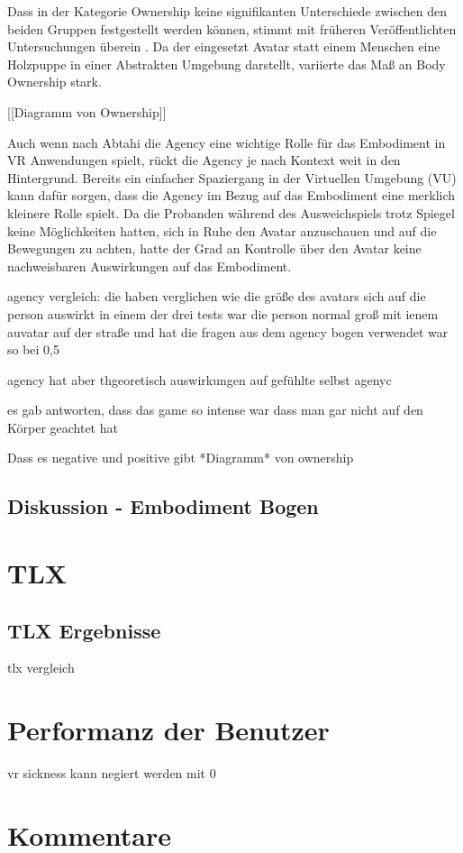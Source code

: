 Dass in der Kategorie Ownership keine signifikanten Unterschiede zwischen den beiden Gruppen festgestellt werden können, stimmt mit früheren Veröffentlichten Untersuchungen überein \cite{Koilias2019}\cite{Caspar2015}\cite{Kalckert2012}. Da der eingesetzt Avatar statt einem Menschen eine Holzpuppe in einer Abstrakten Umgebung darstellt, variierte das Maß an Body Ownership stark.


[[Diagramm von Ownership]]


Auch wenn nach Abtahi \cite{Abtahi2019} die Agency eine wichtige Rolle für das Embodiment in VR Anwendungen spielt, rückt die Agency je nach Kontext weit in den Hintergrund. Bereits ein einfacher Spaziergang in der Virtuellen Umgebung (VU) kann dafür sorgen, dass die Agency im Bezug auf das Embodiment eine merklich kleinere Rolle spielt. Da die Probanden während des Ausweichspiels trotz Spiegel keine Möglichkeiten hatten, sich in Ruhe den Avatar anzuschauen und auf die Bewegungen zu achten, hatte der Grad an Kontrolle über den Avatar keine nachweisbaren Auswirkungen auf das Embodiment.


agency vergleich: \cite{Abtahi2019}
die haben verglichen wie die größe des avatars sich auf die person auswirkt
in einem der drei tests war die person normal groß mit ienem auvatar auf der straße und hat die fragen aus dem agency bogen verwendet
war so bei 0,5





agency hat aber thgeoretisch auswirkungen auf gefühlte selbst agenyc

es gab antworten, dass das game so intense war dass man gar nicht auf den Körper geachtet hat



Dass es negative und positive gibt
*Diagramm* von ownership




\subsection{Diskussion - Embodiment Bogen}


\section{TLX}


\subsection{TLX Ergebnisse}
\cite{Abtahi2019}
tlx vergleich

\section{Performanz der Benutzer}


vr sickness kann negiert werden mit 0%

\section{Kommentare}





















